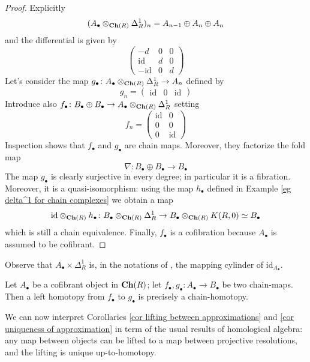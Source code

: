 \begin{proof}
Explicitly
\[
(A_\bullet \otimes_{\mathbf{Ch}(R)} \Delta^1_R)_n = A_{n-1} \oplus A_n \oplus A_n
\]
and the differential is given by
\[
\begin{pmatrix}
- d & 0 & 0 \\ \mathrm{id} & d & 0 \\ - \mathrm{id} & 0 & d
\end{pmatrix}
\]
Let's consider the map $g_\bullet \colon A_\bullet \otimes_{\mathbf{Ch}(R)} \Delta^1_R \to A_n$ defined by
\[
g_n = \begin{pmatrix} \mathrm{id} & 0 & \mathrm{id} \end{pmatrix}
\]
Introduce also $f_\bullet \colon B_\bullet \oplus B_\bullet \to A_\bullet \otimes_{\mathbf{Ch}(R)} \Delta^1_R$ setting
\[
f_n = \begin{pmatrix} \mathrm{id} & 0 \\ 0 & 0 \\ 0 & \mathrm{id} \end{pmatrix}
\]
Inspection shows that $f_\bullet$ and $g_\bullet$ are chain maps. Moreover, they factorize the fold map
\[
\nabla \colon B_\bullet \oplus B_\bullet \to B_\bullet
\]
The map $g_\bullet$ is clearly surjective in every degree; in particular it is a fibration. Moreover, it is a quasi-isomorphism: using the map $h_\bullet$ defined in Example \ref{eg delta^1 for chain complexes} we obtain a map
\[
\mathrm{id} \otimes_{\mathbf{Ch}(R)} h_\bullet \colon B_\bullet \otimes_{\mathbf{Ch}(R)} \Delta^1_R \to B_\bullet \otimes_{\mathbf{Ch}(R)} K(R,0) \simeq B_\bullet
\]
which is still a chain equivalence. Finally, $f_\bullet$ is a cofibration because $A_\bullet$ is assumed to be cofibrant.
\end{proof}

\begin{rmk}
Observe that $A_\bullet \times \Delta^1_R$ is, in the notations of \cite[Ch. 1.5]{weibel}, the mapping cylinder of $\mathrm{id}_{A_\bullet}$.
\end{rmk}

\begin{cor}
Let $A_\bullet$ be a cofibrant object in $\mathbf{Ch}(R)$; let $f_\bullet, g_\bullet \colon A_\bullet \to B_\bullet$ be two chain-maps. Then a left homotopy from $f_\bullet$ to $g_\bullet$ is precisely a chain-homotopy.
\end{cor}

\begin{rmk}
We can now interpret Corollaries \ref{cor lifting between approximations} and \ref{cor uniqueness of approximation} in term of the usual results of homological algebra: any map between objects can be lifted to a map between projective resolutions, and the lifting is unique up-to-homotopy.
\end{rmk}

